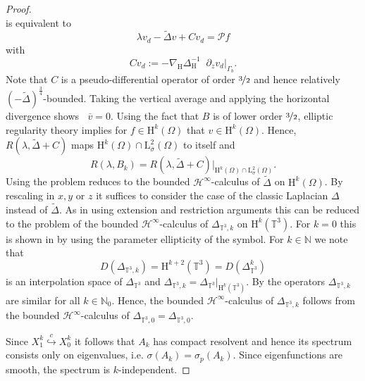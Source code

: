 \documentclass[preprint]{elsarticle}
\numberwithin{equation}{section}
\newcommand {\N}	{\mathbb{N}}
\newcommand {\T}	{\mathbb{T}}
\DeclareMathOperator{\divH}{div_{\H}}
\newcommand{\sP}{\mathcal{P}}
\renewcommand{\H}{\mathrm{H}}
\newcommand{\sigmabar}{\bar{\sigma}}
\newcommand{\dk}[1]{\partial_{#1}}
\newcommand{\dz}{\dk{z}}
\renewcommand{\bar}[1]{\overline{#1}}
\newcommand{\vbar}{\bar{v}}
\newcommand{\nablaH}{\nabla_{\H}}
\newcommand{\DeltaH}{\Delta_{\H}}
\newcommand{\rL}{\mathrm{L}}
\newcommand{\rH}{\H}
\begin{document}
\begin{proof}
\begin{equation*}
	\end{equation*}
	is equivalent to 
	\begin{equation*}
		\lambda v_d - \tilde{\Delta}v + C v_d = \sP f 
	\end{equation*}
	with 
	\begin{equation*}
		C v_d := -\nablaH \DeltaH^{-1} \divH \dz v_d\big|_{\Gamma_b} . 
	\end{equation*}
	Note that $C$ is a pseudo-differential operator of order $\nicefrac{3}{2}$ and hence
	relatively $(-\tilde{\Delta})^{\frac{3}{4}}$-bounded.
	Taking the vertical average and applying the horizontal divergence shows $\divH \vbar = 0$. Using the fact that $B$ is of lower order $\nicefrac{3}{2}$, elliptic regularity theory implies for $f \in \rH^k(\Omega)$ that $v \in \rH^k(\Omega)$. Hence, $R(\lambda,\tilde{\Delta}+C)$ maps $\rH^k(\Omega) \cap \rL^2_{\sigmabar}(\Omega)$ to itself and
	\begin{equation*}
		R(\lambda,B_k) = R(\lambda,\tilde{\Delta} +  C)\big|_{\rH^k(\Omega)\cap\rL^2_{\sigmabar}(\Omega)} .
	\end{equation*}
	Using \cite[Corollary 3.3.15]{PS:16_2} the problem reduces to the bounded $\mathcal{H}^\infty$-calculus of $\tilde{\Delta}$ on $\rH^k(\Omega)$.
	By rescaling in $x,y$ or $z$ it suffices to consider the case of the classic Laplacian $\Delta$ instead of $\tilde{\Delta}$.
	As in \cite[Lemma 4.1]{GGHHK:17_2} using extension and restriction arguments this can be reduced to the problem of the bounded $\mathcal{H}^\infty$-calculus of $\Delta_{\T^3,k}$ on $\rH^k(\T^3)$.
	For $k = 0$ this is shown in \cite[Lemma 4.1]{GGHHK:17_2} by using the parameter ellipticity of the symbol. For $k \in \N$ we note that
	\begin{equation*}
		D(\Delta_{\T^3,k}) = \rH^{k+2}(\T^3) = D(\Delta_{\T^3}^k) 
	\end{equation*}
	is an interpolation space of $\Delta_{\T^3}$
	and $\Delta_{\T^3,k} = \Delta_{\T^3}\big|_{\rH^k(\T^3)}$. By \cite[Corollary II.5.3]{EN:00_2} the operators $\Delta_{\T^3,k}$ are similar for all $k \in \N_0$. Hence, the bounded $\mathcal{H}^\infty$-calculus of $\Delta_{\T^3,k}$ follows from the bounded $\mathcal{H}^\infty$-calculus of $\Delta_{\T^3,0}=\Delta_{\T^3,0}$. 
	
	\medskip 
	
	Since $X_1^k \stackrel{c}{\hookrightarrow} X_0^k$ it follows that $A_k$ has compact resolvent and hence its spectrum consists only on eigenvalues, i.e. $\sigma(A_k) = \sigma_p(A_k)$. 
	Since eigenfunctions are smooth, the spectrum is $k$-independent. 
\end{proof} 
\end{document}

